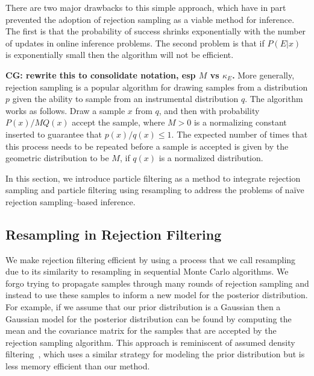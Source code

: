 \documentclass[twoside]{article}
\begin{document}
There are two major drawbacks to this simple approach, which have in part prevented the adoption
of rejection sampling as a viable method for inference.  The first is that the probability of success shrinks exponentially with the number of updates
in online inference problems.
The second problem is that if $P(E|x)$ is exponentially small then the algorithm will not be efficient.

{\bf CG: rewrite this to consolidate notation, esp $M$ vs $\kappa_E$.}
More generally, rejection sampling is a
popular algorithm for drawing samples from a distribution $p$ given the
ability to sample from an instrumental distribution $q$.  The algorithm works
as follows. Draw a sample  $x$ from $q$, and then with probability $P(x)/M
Q(x)$ accept the sample, where $M > 0$ is a normalizing constant inserted to
guarantee that $p(x)/q(x) \le 1$.  The expected number of times that this
process needs to be repeated before a sample is accepted is given by the
geometric distribution to be $M$, if $q(x)$ is a normalized distribution.


In this section, we introduce particle filtering as a method to
integrate rejection sampling and particle filtering using resampling to
address the problems of na\"ive rejection sampling--based inference.

\subsection{Resampling in Rejection Filtering}

We make rejection filtering efficient by using a process that we call resampling due to
its similarity to resampling in sequential Monte Carlo algorithms.  We
forgo trying to propagate samples through many rounds of rejection sampling and instead
to use these samples to inform a new model for the posterior distribution.  For example, if
we assume that our prior distribution is a Gaussian then a Gaussian model for the posterior
distribution can be found by computing the mean and the covariance matrix for the samples
that are accepted by the rejection sampling algorithm.  This approach is
reminiscent of assumed density filtering~\cite{minka_expectation_2001}, which uses a similar strategy
for modeling the prior distribution but is less memory efficient than
our method.
\end{document}
